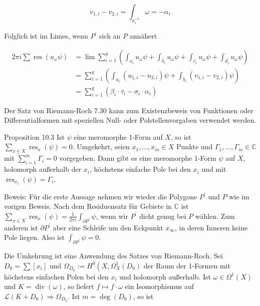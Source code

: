 \documentclass[10pt, letterpaper]{article}
\begin{document}
$$
v_{1, i}-v_{2, i}=\int_{a_{i}^{-1}} \omega=-\alpha_{i}
$$

Folglich ist im Limes, wenn $P^{\prime}$ sich an $P$ annähert

$$
\begin{aligned}
2 \pi i \sum \operatorname{res}\left(u_{\omega} \psi\right) & =\lim \sum_{i=1}^{g}\left(\int_{a_{i}^{\prime}} u_{\omega} \psi+\int_{b_{i}^{\prime}} u_{\omega} \psi+\int_{c_{i}^{\prime}} u_{\omega} \psi+\int_{d_{i}^{\prime}} u_{\omega} \psi\right) \\
& =\sum_{i=1}^{g}\left(\int_{a_{i}}\left(u_{1, i}-u_{2, i}\right) \psi+\int_{b_{i}}\left(v_{1, i}-v_{2, i}\right) \psi\right) \\
& =\sum_{i=1}^{g}\left(\beta_{i} \cdot \tau_{i}-\sigma_{i} \cdot \alpha_{i}\right)
\end{aligned}
$$

Der Satz von Riemann-Roch 7.30 kann zum Existenzbeweis von Funktionen oder Differentialformen mit speziellen Null- oder Polstellenvorgaben verwendet werden.

Proposition 10.3 Ist $\psi$ eine meromorphe 1-Form auf $X$, so ist $\sum_{x \in X} \operatorname{res}_{x}(\psi)=0$. Umgekehrt, seien $x_{1}, \ldots, x_{m} \in X$ Punkte und $\Gamma_{1}, \ldots, \Gamma_{m} \in \mathbb{C}$ mit $\sum_{i=1}^{m} \Gamma_{i}=0$ vorgegeben. Dann gibt es eine meromorphe 1-Form $\psi$ auf $X$, holomorph außerhalb der $x_{i}$, höchstens einfache Pole bei den $x_{i}$ und mit $\operatorname{res}_{x_{i}}(\psi)=\Gamma_{i}$.

Beweis: Für die erste Aussage nehmen wir wieder die Polygone $P^{\prime}$ und $P$ wie im vorigen Beweis. Nach dem Residuensatz für Gebiete in $\mathbb{C}$ ist $\sum_{x \in X} \operatorname{res}_{x}(\psi)=\frac{1}{2 \pi i} \int_{\partial P^{\prime}} \psi$, wenn wir $P^{\prime}$ dicht genug bei $P$ wählen. Zum anderen ist $\partial P^{\prime}$ aber eine Schleife um den Eckpunkt $x_{\infty}$, in deren Inneren keine Pole liegen. Also ist $\int_{\partial P^{\prime}} \psi=0$.

Die Umkehrung ist eine Anwendung des Satzes von Riemann-Roch. Sei $D_{0}= \sum\left[x_{i}\right]$ und $\Omega_{D_{0}}:=H^{0}\left(X, \Omega_{X}^{1}\left(D_{0}\right)\right.$ der Raum der 1-Formen mit höchstens einfachen Polen bei den $x_{i}$ und holomorph außerhalb. Ist $\omega \in \Omega^{1}(X)$ und $K=\operatorname{div}(\omega)$, so liefert $f \longmapsto f \cdot \omega$ ein Isomorphismus auf $\mathcal{L}\left(K+D_{0}\right) \Longrightarrow \Omega_{D_{0}}$. Ist $m=\operatorname{deg}\left(D_{0}\right)$, so ist
\end{document}
